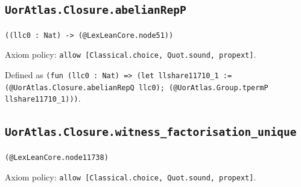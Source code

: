 \documentclass[11pt]{article}
\begin{document}
\subsection*{\texttt{UorAtlas.Closure.abelianRepP}}
\noindent\texttt{((llc0 : Nat) -> (@LexLeanCore.node51))}\par
\noindent Axiom policy: \texttt{allow [Classical.choice, Quot.sound, propext]}.\par
\noindent Defined as \texttt{(fun (llc0 : Nat) => (let llshare11710\_1 := (@UorAtlas.Closure.abelianRepQ llc0); (@UorAtlas.Group.tpermP llshare11710\_1)))}.\par
\subsection*{\texttt{UorAtlas.Closure.witness\_factorisation\_unique}}
\noindent\texttt{(@LexLeanCore.node11738)}\par
\noindent Axiom policy: \texttt{allow [Classical.choice, Quot.sound, propext]}.\par
\end{document}
